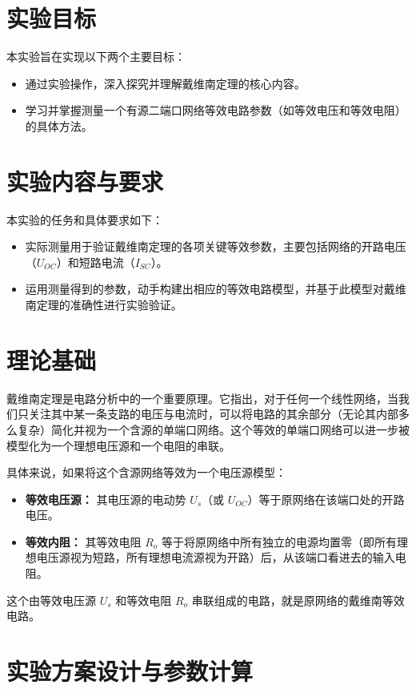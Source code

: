 \documentclass{Report} %
\begin{document}
\makecover

\section{实验目标}
本实验旨在实现以下两个主要目标：
\begin{itemize}
    \item 通过实验操作，深入探究并理解戴维南定理的核心内容。
    \item 学习并掌握测量一个有源二端口网络等效电路参数（如等效电压和等效电阻）的具体方法。
\end{itemize}

\section{实验内容与要求}
本实验的任务和具体要求如下：
\begin{itemize}
    \item 实际测量用于验证戴维南定理的各项关键等效参数，主要包括网络的开路电压（$U_{OC}$）和短路电流（$I_{SC}$）。
    \item 运用测量得到的参数，动手构建出相应的等效电路模型，并基于此模型对戴维南定理的准确性进行实验验证。
\end{itemize}

\section{理论基础}
戴维南定理是电路分析中的一个重要原理。它指出，对于任何一个线性网络，当我们只关注其中某一条支路的电压与电流时，可以将电路的其余部分（无论其内部多么复杂）简化并视为一个含源的单端口网络。这个等效的单端口网络可以进一步被模型化为一个理想电压源和一个电阻的串联。

具体来说，如果将这个含源网络等效为一个电压源模型：
\begin{itemize}
    \item \textbf{等效电压源：} 其电压源的电动势 $U_s$（或 $U_{OC}$）等于原网络在该端口处的开路电压。
    \item \textbf{等效内阻：} 其等效电阻 $R_o$ 等于将原网络中所有独立的电源均置零（即所有理想电压源视为短路，所有理想电流源视为开路）后，从该端口看进去的输入电阻。
\end{itemize}
这个由等效电压源 $U_s$ 和等效电阻 $R_o$ 串联组成的电路，就是原网络的戴维南等效电路。




\section{实验方案设计与参数计算}
\end{document}

